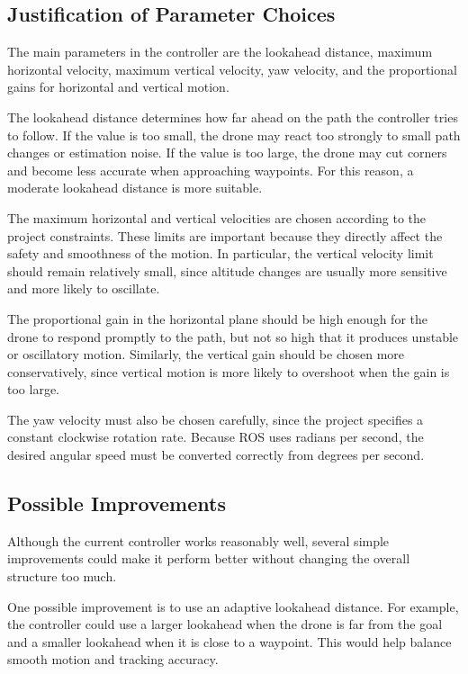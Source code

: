 \documentclass[12pt,twoside,letterpaper]{article}
\begin{document}
\subsection{Justification of Parameter Choices}

The main parameters in the controller are the lookahead distance, maximum horizontal velocity, maximum vertical velocity, yaw velocity, and the proportional gains for horizontal and vertical motion.

The lookahead distance determines how far ahead on the path the controller tries to follow. If the value is too small, the drone may react too strongly to small path changes or estimation noise. If the value is too large, the drone may cut corners and become less accurate when approaching waypoints. For this reason, a moderate lookahead distance is more suitable.

The maximum horizontal and vertical velocities are chosen according to the project constraints. These limits are important because they directly affect the safety and smoothness of the motion. In particular, the vertical velocity limit should remain relatively small, since altitude changes are usually more sensitive and more likely to oscillate.

The proportional gain in the horizontal plane should be high enough for the drone to respond promptly to the path, but not so high that it produces unstable or oscillatory motion. Similarly, the vertical gain should be chosen more conservatively, since vertical motion is more likely to overshoot when the gain is too large.

The yaw velocity must also be chosen carefully, since the project specifies a constant clockwise rotation rate. Because ROS uses radians per second, the desired angular speed must be converted correctly from degrees per second.

\subsection{Possible Improvements}

Although the current controller works reasonably well, several simple improvements could make it perform better without changing the overall structure too much.

One possible improvement is to use an adaptive lookahead distance. For example, the controller could use a larger lookahead when the drone is far from the goal and a smaller lookahead when it is close to a waypoint. This would help balance smooth motion and tracking accuracy.
\end{document}
